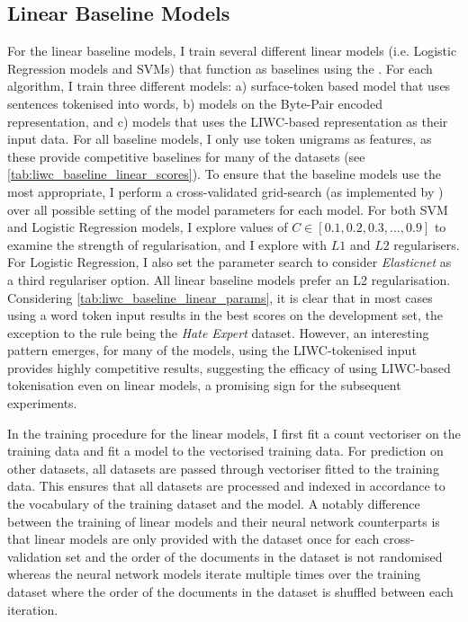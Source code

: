\subsection{Linear Baseline Models}\label{sec:baseline_models}

For the linear baseline models, I train several different linear models (i.e. Logistic Regression models and SVMs) that function as baselines using the \citet{Pedregosa:2015}. 
For each algorithm, I train three different models: a) surface-token based model that uses sentences tokenised into words, b) models on the Byte-Pair encoded representation, and c) models that uses the LIWC-based representation as their input data. 
For all baseline models, I only use token unigrams as features, as these provide competitive baselines for many of the datasets (see \autoref{tab:liwc_baseline_linear_scores}). 
To ensure that the baseline models use the most appropriate, I perform a cross-validated grid-search (as implemented by \citet{Pedregosa:2015}) over all possible setting of the model parameters for each model.
For both SVM and Logistic Regression models, I explore values of $C\in [0.1, 0.2, 0.3, \ldots, 0.9]$ to examine the strength of regularisation, and I explore with $L1$ and $L2$ regularisers. 
For Logistic Regression, I also set the parameter search to consider \textit{Elasticnet} as a third regulariser option.
All linear baseline models prefer an L2 regularisation. Considering \cref{tab:liwc_baseline_linear_params}, it is clear that in most cases using a word token input results in the best scores on the development set, the exception to the rule being the \textit{Hate Expert} dataset. However, an interesting pattern emerges, for many of the models, using the LIWC-tokenised input provides highly competitive results, suggesting the efficacy of using LIWC-based tokenisation even on linear models, a promising sign for the subsequent experiments.

In the training procedure for the linear models, I first fit a count vectoriser on the training data and fit a model to the vectorised training data. For prediction on other datasets, all datasets are passed through vectoriser fitted to the training data. This ensures that all datasets are processed and indexed in accordance to the vocabulary of the training dataset and the model. A notably difference between the training of linear models and their neural network counterparts is that linear models are only provided with the dataset once for each cross-validation set and the order of the documents in the dataset is not randomised whereas the neural network models iterate multiple times over the training dataset where the order of the documents in the dataset is shuffled between each iteration.

